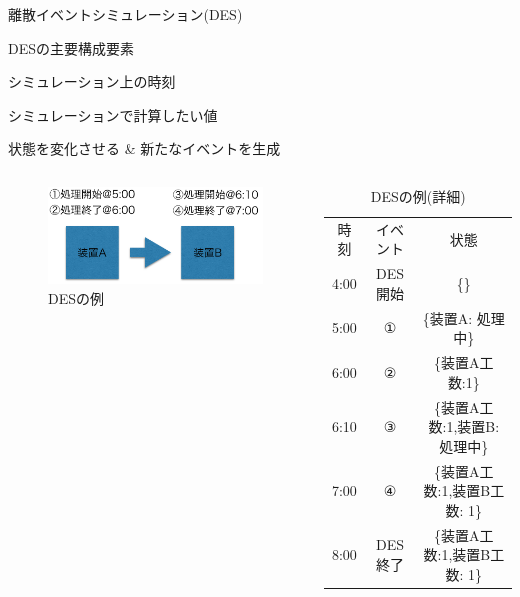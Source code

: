 \documentclass[dvipdfmx,uplatex,11pt]{beamer}
\theoremstyle{definition}
\begin{document}
\begin{frame}{離散イベントシミュレーション(DES)}
  \begin{block}{DESの主要構成要素}
  \begin{description}
      \small
    \item[時刻] シミュレーション上の時刻
    \item[状態] シミュレーションで計算したい値
    \item[イベント] 状態を変化させる \& 新たなイベントを生成
  \end{description}
\end{block}

\begin{columns}
\begin{column}{0.4\textwidth}
 \begin{figure}
   \includegraphics[scale=0.3]{sim.png}
   \caption{DESの例}
  \end{figure}
\end{column}

  \begin{column}{0.6\textwidth}

  \tiny
    \begin{table}
      \caption{DESの例(詳細)}
      \begin{tabular}{ccc}
        時刻 & イベント & 状態\\
        4:00 & DES開始 & \{\}    \\
        5:00 & ① & \{装置A: 処理中\} \\
        6:00 & ② & \{装置A工数:1\} \\
        6:10 & ③ & \{装置A工数:1,装置B: 処理中\} \\
        7:00 & ④& \{装置A工数:1,装置B工数: 1\} \\
        8:00 & DES終了 & \{装置A工数:1,装置B工数: 1\} 
      \end{tabular}
    \end{table}
  \end{column}
\end{columns}

\end{frame}
\end{document}
